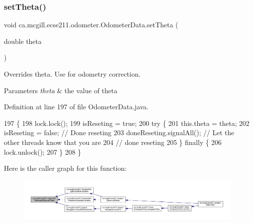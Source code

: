 \subsubsection{\texorpdfstring{set\+Theta()}{setTheta()}}
{\footnotesize\ttfamily void ca.\+mcgill.\+ecse211.\+odometer.\+Odometer\+Data.\+set\+Theta (\begin{DoxyParamCaption}\item[{double}]{theta }\end{DoxyParamCaption})}

Overrides theta. Use for odometry correction.


\begin{DoxyParams}{Parameters}
{\em theta} & the value of theta \\
\hline
\end{DoxyParams}


Definition at line 197 of file Odometer\+Data.\+java.


\begin{DoxyCode}
197                                      \{
198     lock.lock();
199     isReseting = \textcolor{keyword}{true};
200     \textcolor{keywordflow}{try} \{
201       this.theta = theta;
202       isReseting = \textcolor{keyword}{false}; \textcolor{comment}{// Done reseting}
203       doneReseting.signalAll(); \textcolor{comment}{// Let the other threads know that you are}
204                                 \textcolor{comment}{// done reseting}
205     \} \textcolor{keywordflow}{finally} \{
206       lock.unlock();
207     \}
208   \}
\end{DoxyCode}
Here is the caller graph for this function\+:
\nopagebreak
\begin{figure}[H]
\begin{center}
\leavevmode
\includegraphics[width=350pt]{classca_1_1mcgill_1_1ecse211_1_1odometer_1_1_odometer_data_a419b8f07c2c5374411c8e62298e9a402_icgraph}
\end{center}
\end{figure}
\mbox{\label{classca_1_1mcgill_1_1ecse211_1_1odometer_1_1_odometer_data_a2911d7215e47f3064defe016b46bfeef}} 
